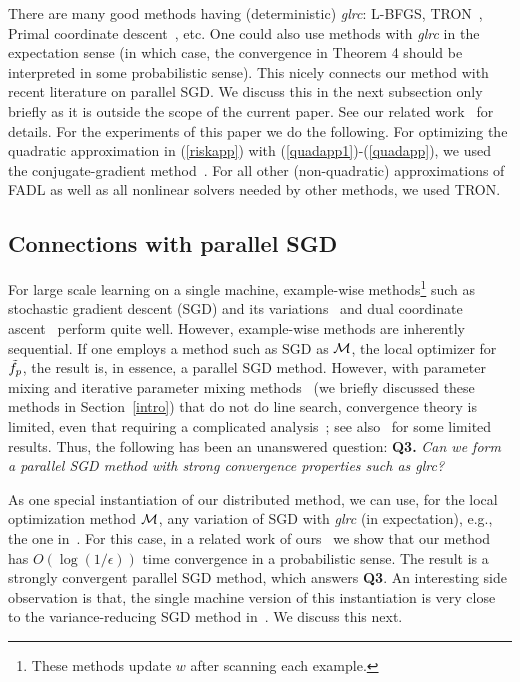 \documentclass[twoside, 11pt]{article}
\begin{document}
There are many good methods having (deterministic) {\it glrc}: L-BFGS, TRON~\citep{lin2008}, Primal coordinate descent~\citep{chang2008}, etc. One could also use methods with {\it glrc} in the expectation sense (in which case, the convergence in Theorem 4 should be interpreted in some probabilistic sense). This nicely connects our method with recent literature on parallel SGD. We discuss this in the next subsection only briefly as it is outside the scope of the current paper. See our related work~\citep{mahajan2013} for details. For the experiments of this paper we do the following. For optimizing the quadratic approximation in (\ref{riskapp}) with (\ref{quadapp1})-(\ref{quadapp}), we used the conjugate-gradient method~\citep{Shewchuk94anintroduction}. For all other (non-quadratic) approximations of FADL as well as all nonlinear solvers needed by other methods, we used TRON.


\subsection{Connections with parallel SGD}
\label{subsec:psgd}

For large scale learning on a single machine, example-wise methods\footnote{These methods update $w$ after scanning each example.} such as stochastic gradient descent (SGD) and its variations~\citep{bottou2010, johnson2013} and dual coordinate ascent~\citep{hsieh2008} perform quite well. However, example-wise methods are inherently sequential. If one employs a method such as SGD as ${\cal M}$, the local optimizer for $\tilde{f}_p$, the result is, in essence, a parallel SGD method. However, with parameter mixing and iterative parameter mixing methods~\citep{mann2009, hall2010, mcdonald2010} (we briefly discussed these methods in Section~\ref{intro}) that do not do line search, convergence theory is limited, even that requiring a complicated analysis~\citep{zinkevich2010}; see also~\citet{mann2009} for some limited results. Thus, the following has been an unanswered question: {\bf Q3.} {\it Can we form a parallel SGD method with strong convergence properties such as glrc?}

As one special instantiation of our distributed method, we can use, for the local optimization method ${\cal M}$, any variation of SGD with {\it glrc} (in expectation), e.g., the one in~\citet{johnson2013}. For this case, in a related work of ours~\citep{mahajan2013} we show that our method has $O(\log (1/\epsilon))$ time convergence in a probabilistic sense. The result is a strongly convergent parallel SGD method, which answers {\bf Q3}. An interesting side observation is that, the single machine version of this instantiation is very close to the variance-reducing SGD method in~\citet{johnson2013}. We discuss this next.
\end{document}
